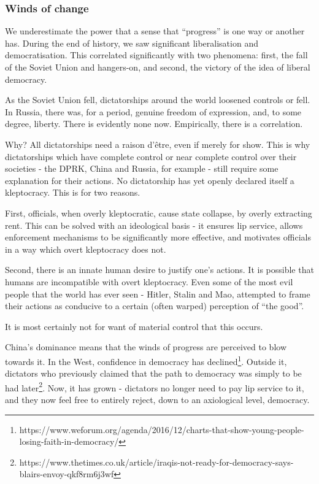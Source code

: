 \documentclass[11pt,a4paper]{report}
\begin{document}
\subsubsection{Winds of change}\label{winds-of-change}

\begin{multicols}{2}

We underestimate the power that a sense that ``progress'' is one way or
another has. During the end of history, we saw significant
liberalisation and democratisation. This correlated significantly with
two phenomena: first, the fall of the Soviet Union and hangers-on, and
second, the victory of the idea of liberal democracy.

As the Soviet Union fell, dictatorships around the world loosened
controls or fell. In Russia, there was, for a period, genuine freedom of
expression, and, to some degree, liberty. There is evidently none now.
Empirically, there is a correlation.

Why? All dictatorships need a raison d'être, even if merely for show.
This is why dictatorships which have complete control or near complete
control over their societies - the DPRK, China and Russia, for example -
still require some explanation for their actions. No dictatorship has
yet openly declared itself a kleptocracy. This is for two reasons.

First, officials, when overly kleptocratic, cause state collapse, by
overly extracting rent. This can be solved with an ideological basis -
it ensures lip service, allows enforcement mechanisms to be
significantly more effective, and motivates officials in a way which
overt kleptocracy does not.

Second, there is an innate human desire to justify one's actions. It is
possible that humans are incompatible with overt kleptocracy. Even some
of the most evil people that the world has ever seen - Hitler, Stalin
and Mao, attempted to frame their actions as conducive to a certain
(often warped) perception of ``the good''.

It is most certainly not for want of material control that this occurs.

China's dominance means that the winds of progress are perceived to blow
towards it. In the West, confidence in democracy has declined\footnote{https://www.weforum.org/agenda/2016/12/charts-that-show-young-people-losing-faith-in-democracy/}.
Outside it, dictators who previously claimed that the path to democracy
was simply to be had later\footnote{https://www.thetimes.co.uk/article/iraqis-not-ready-for-democracy-says-blairs-envoy-qkf8rm6j3wf}.
Now, it has grown - dictators no longer need to pay lip service to it,
and they now feel free to entirely reject, down to an axiological level,
democracy.


\end{multicols}
\end{document}
